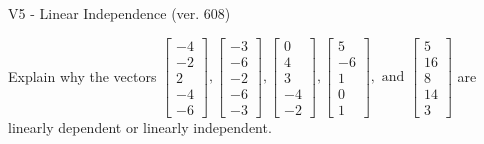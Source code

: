 \begin{exercise}
  \begin{exerciseTitle}V5 - Linear Independence (ver. 608)\end{exerciseTitle}
  \begin{exerciseStatement}
    Explain why the vectors \(\left[\begin{array}{r}
-4 \\
-2 \\
2 \\
-4 \\
-6
\end{array}\right] , \left[\begin{array}{r}
-3 \\
-6 \\
-2 \\
-6 \\
-3
\end{array}\right] , \left[\begin{array}{r}
0 \\
4 \\
3 \\
-4 \\
-2
\end{array}\right] , \left[\begin{array}{r}
5 \\
-6 \\
1 \\
0 \\
1
\end{array}\right] , \text{ and } \left[\begin{array}{r}
5 \\
16 \\
8 \\
14 \\
3
\end{array}\right]\) are linearly dependent or linearly independent.	



\end{exerciseStatement}
\end{exercise}
